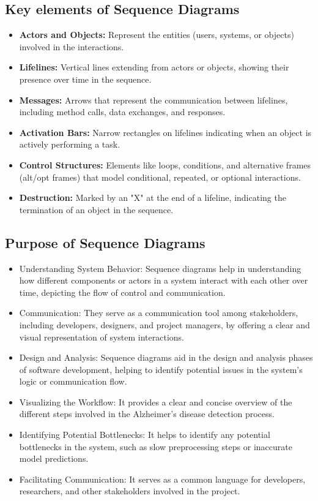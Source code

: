 \subsection{Key elements of Sequence Diagrams}

\begin{itemize}
    \item \textbf{Actors and Objects:} Represent the entities (users, systems, or objects) involved in the interactions.
    \item \textbf{Lifelines:} Vertical lines extending from actors or objects, showing their presence over time in the sequence.
    \item \textbf{Messages:} Arrows that represent the communication between lifelines, including method calls, data exchanges, and responses.
    \item \textbf{Activation Bars:} Narrow rectangles on lifelines indicating when an object is actively performing a task.
    \item \textbf{Control Structures:} Elements like loops, conditions, and alternative frames (alt/opt frames) that model conditional, repeated, or optional interactions.
    \item \textbf{Destruction:} Marked by an "X" at the end of a lifeline, indicating the termination of an object in the sequence.
\end{itemize}
\subsection{Purpose of Sequence Diagrams}
\begin{itemize}
    \item {Understanding System Behavior:} Sequence diagrams help in understanding how different components or actors in a system interact with each other over time, depicting the flow of control and communication.
    \item {Communication:} They serve as a communication tool among stakeholders, including developers, designers, and project managers, by offering a clear and visual representation of system interactions.
    \item {Design and Analysis:} Sequence diagrams aid in the design and analysis phases of software development, helping to identify potential issues in the system’s logic or communication flow.
    \item {Visualizing the Workflow:} It provides a clear and concise overview of the different steps involved in the Alzheimer’s disease detection process.
    \item {Identifying Potential Bottlenecks:} It helps to identify any potential bottlenecks in the system, such as slow preprocessing steps or inaccurate model predictions.
    \item {Facilitating Communication:} It serves as a common language for developers, researchers, and other stakeholders involved in the project.
\end{itemize}

